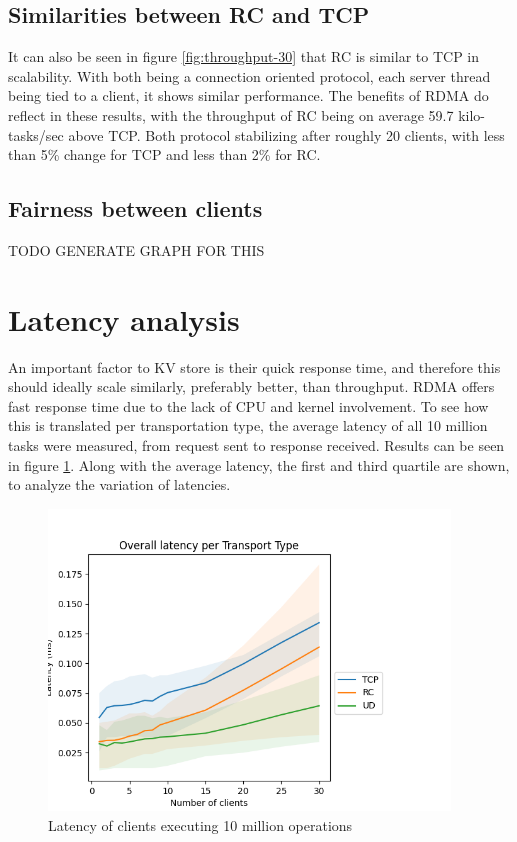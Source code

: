\subsection{Similarities between RC and TCP}
It can also be seen in figure \ref{fig:throughput-30} that RC is similar to TCP in scalability.
With both being a connection oriented protocol, each server thread being tied to a client, it shows similar performance.
The benefits of RDMA do reflect in these results, with the throughput of RC being on average 59.7 kilo-tasks/sec above TCP.
Both protocol stabilizing after roughly 20 clients, with less than 5\% change for TCP and less than 2\% for RC.

\subsection{Fairness between clients}
TODO GENERATE GRAPH FOR THIS

\section{Latency analysis}\label{sec:latency:analysis}
An important factor to KV store is their quick response time, and therefore this should ideally scale similarly, preferably better, than throughput.
RDMA offers fast response time due to the lack of CPU and kernel involvement.
To see how this is translated per transportation type, the average latency of all 10 million tasks were measured, from request sent to response received.
Results can be seen in figure \ref{fig:latency-30}.
Along with the average latency, the first and third quartile are shown, to analyze the variation of latencies.

\begin{figure}
    \centering
    \includegraphics[height=80mm]{figures/PNG/Latency_avg_30}
    \caption{Latency of clients executing 10 million operations}
    \label{fig:latency-30}
\end{figure}

